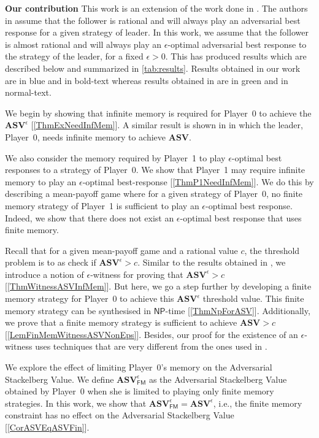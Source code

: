 \textbf{\bf Our contribution} This work is an extension of the work done in \cite{FGR20}. The authors in \cite{FGR20} assume that the follower is rational and will always play an adversarial best response for a given strategy of leader. In this work, we assume that the follower is almost rational and will always play an $\epsilon$-optimal adversarial best response to the strategy of the leader, for a fixed $\epsilon > 0$. This has produced results which are described below and summarized in \cref{tab:results}. Results obtained in our work are in blue and in bold-text whereas results obtained in \cite{FGR20} are in green and in normal-text.

We begin by showing that infinite memory is required for Player~0 to achieve the $\mathbf{ASV}^{\epsilon}$ [\cref{ThmExNeedInfMem}]. A similar result is shown in \cite{FGR20} in which the leader, Player~0, needs infinite memory to achieve $\mathbf{ASV}$.

We also consider the memory required by Player~1 to play $\epsilon$-optimal best responses to a strategy of Player~0. We show that Player~1 may require infinite memory to play an $\epsilon$-optimal best-response [\cref{ThmP1NeedInfMem}]. We do this by describing a mean-payoff game where for a given strategy of Player~0, no finite memory strategy of Player~1 is sufficient to play an $\epsilon$-optimal best response. Indeed, we show that there does not exist an $\epsilon$-optimal best response that uses finite memory.

Recall that for a given mean-payoff game and a rational value $c$, the threshold problem is to as check if $\mathbf{ASV}^{\epsilon} > c$. Similar to the results obtained in \cite{FGR20}, we introduce a notion of $\epsilon$-witness for proving that $\mathbf{ASV}^{\epsilon} > c$ [\cref{ThmWitnessASVInfMem}]. But here, we go a step further by developing a finite memory strategy for Player~0 to achieve this $\mathbf{ASV}^{\epsilon}$ threshold value. This finite memory strategy can be synthesised in $\mathsf{NP}$-time [\cref{ThmNpForASV}]. Additionally, we prove that a finite memory strategy is sufficient to achieve $\mathbf{ASV} > c$ [\cref{LemFinMemWitnessASVNonEps}]. Besides, our proof for the existence of an $\epsilon$-witness uses techniques that are very different from the ones used in \cite{FGR20}.

We explore the effect of limiting Player~0's memory on the Adversarial Stackelberg Value. We define $\mathbf{ASV}^{\epsilon}_{\mathsf{FM}}$ as the Adversarial Stackelberg Value obtained by Player~0 when she is limited to playing only finite memory strategies. In this work, we show that $\mathbf{ASV}^{\epsilon}_{\mathsf{FM}} = \mathbf{ASV}^{\epsilon}$, i.e., the finite memory constraint has no effect on the Adversarial Stackelberg Value [\cref{CorASVEqASVFin}].

